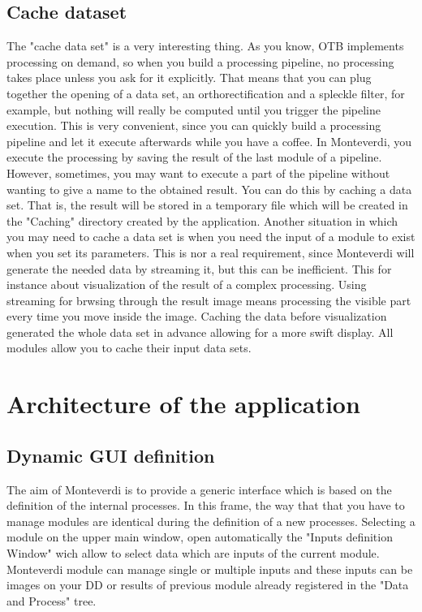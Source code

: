 \documentclass{InsightSoftwareGuide}
\begin{document}
\section{Cache dataset}
The "cache data set" is a very interesting thing. As you know, OTB implements processing on demand, so when you build a 
processing pipeline, no processing takes place unless you ask for it explicitly. That means that you can plug together
 the opening of a data set, an orthorectification and a spleckle filter, for example, but nothing will really be computed 
until you trigger the pipeline execution. This is very convenient, since you can quickly build a processing pipeline and 
let it execute afterwards while you have a coffee. In Monteverdi, you execute the processing by saving the result of the 
last module of a pipeline. However, sometimes, you may want to execute a part of the pipeline without wanting to give a 
name to the obtained result. You can do this by caching a data set. That is, the result will be stored in a temporary 
file which will be created in the "Caching" directory created by the application. Another situation in which you may need 
to cache a data set is when you need the input of a module to exist when you set its parameters. This is nor a real requirement, 
since Monteverdi will generate the needed data by streaming it, but this can be inefficient. This for instance about visualization
 of the result of a complex processing. Using streaming for brwsing through the result image means processing the visible part 
every time you move inside the image. Caching the data before visualization generated the whole data set in advance allowing 
for a more swift display. All modules allow you to cache their input data sets.

\chapter{Architecture of the application}
\section{Dynamic GUI definition}
The aim of Monteverdi is to provide a generic interface which is based on the definition of the internal processes. 
In this frame, the way that that you have to manage modules are identical during the definition of a new processes.
Selecting a module on the upper main window, open automatically the "Inputs definition Window" wich allow to select data which
are inputs of the current module. Monteverdi module can manage single or multiple inputs and these inputs can be images on your 
DD or results of previous module already registered in the "Data and Process" tree.    
\end{document}
